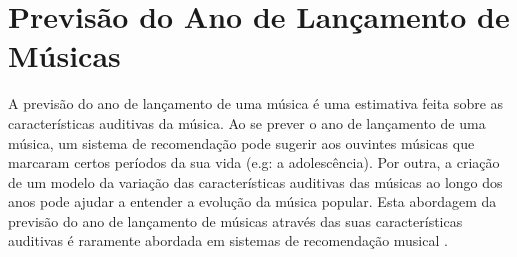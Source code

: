 \section{Previsão do Ano de Lançamento de Músicas}
\label{sec:4previsaoano}

A previsão do ano de lançamento de uma música é uma estimativa feita sobre as características auditivas da música. 
Ao se prever o ano de lançamento de uma música, um sistema de recomendação pode sugerir aos ouvintes músicas 
que marcaram certos períodos da sua vida (e.g: a adolescência). Por outra, a criação de um modelo da variação das características 
auditivas das músicas ao longo dos anos pode ajudar a entender a evolução da música popular. 
Esta abordagem da previsão do ano de lançamento de músicas através das suas características auditivas é raramente abordada em 
sistemas de recomendação musical \citep{Bertin-mahieux2011}.
